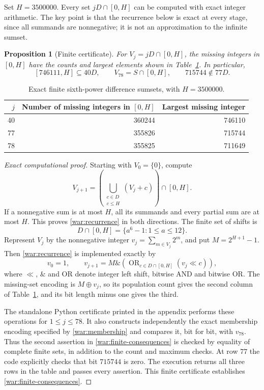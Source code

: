 \documentclass[11pt,a4paper]{article}
\numberwithin{equation}{section}
\newtheorem{proposition}[theorem]{Proposition}
\theoremstyle{remark}
\begin{document}
Set $H=3500000$. Every set $jD\cap[0,H]$ can be computed with exact integer
arithmetic. The key point is that the recurrence below is exact at every
stage, since all summands are nonnegative; it is not an approximation to
the infinite sumset.

\begin{proposition}[Finite certificate]\label{war:finite}
For $V_j=jD\cap[0,H]$, the missing integers in $[0,H]$ have the counts and
largest elements shown in Table~\ref{war:finite-table}. In particular,
\begin{equation}\label{war:finite-consequences}
 [746111,H]\subseteq40D,
 \qquad V_{78}=S\cap[0,H],
 \qquad 715744\notin77D.
\end{equation}
\end{proposition}

\begin{table}[htbp]
\centering
\begin{tabular}{r|r|r}
$j$ & Number of missing integers in $[0,H]$ & Largest missing integer\\
\hline
40 & 360244 & 746110\\
77 & 355826 & 715744\\
78 & 355825 & 711649
\end{tabular}
\caption{Exact finite sixth-power difference sumsets, with $H=3500000$.}
\label{war:finite-table}
\end{table}

\begin{proof}[Exact computational proof]
Starting with $V_0=\{0\}$, compute
\begin{equation}\label{war:recurrence}
 V_{j+1}=
 \left(\bigcup_{\substack{c\in D\\c\leq H}}(V_j+c)\right)\cap[0,H].
\end{equation}
If a nonnegative sum is at most $H$, all its summands and every partial sum
are at most $H$. This proves \eqref{war:recurrence} in both directions.
The finite set of shifts is
\[
 D\cap[0,H]=\{a^6-1:1\leq a\leq12\}.
\]
Represent $V_j$ by the nonnegative integer
$v_j=\sum_{m\in V_j}2^m$, and put $M=2^{H+1}-1$. Then
\eqref{war:recurrence} is implemented exactly by
\[
 v_0=1,\qquad
 v_{j+1}=M\mathbin{\&}
       \left(\mathop{\mathrm{OR}}_{c\in D\cap[0,H]}(v_j\ll c)\right),
\]
where $\ll$, $\mathbin{\&}$ and $\mathrm{OR}$ denote integer left shift,
bitwise AND and bitwise OR. The missing-set encoding is $M\mathbin{\oplus}v_j$,
so its population count gives the second column of
Table~\ref{war:finite-table}, and its bit length minus one gives the third.

The standalone Python certificate printed in the appendix performs these
operations for $1\leq j\leq78$. It also constructs independently the exact
membership encoding specified by \eqref{war:membership} and compares it,
bit for bit, with $v_{78}$. Thus the second assertion in
\eqref{war:finite-consequences} is checked by equality of complete finite
sets, in addition to the count and maximum checks. At row $77$ the code
explicitly checks that bit $715744$ is zero. The execution returns all three
rows in the table and passes every assertion. This finite certificate
establishes \eqref{war:finite-consequences}.
\end{proof}
\end{document}
